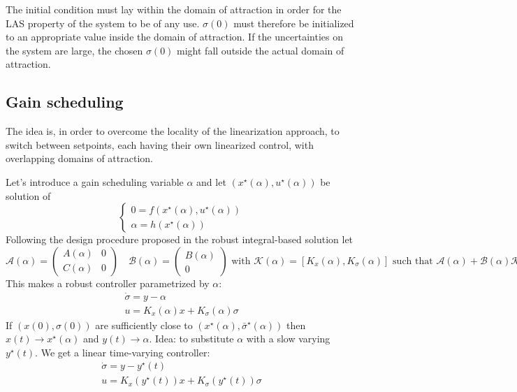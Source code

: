\documentclass{book}
\theoremstyle{definition}
\theoremstyle{remark}
\theoremstyle{remark}
\begin{document}
The initial condition must lay within the domain of attraction in order for the LAS property of the system to be of any use. $\sigma(0)$ must therefore be initialized to an appropriate value inside the domain of attraction. If the uncertainties on the system are large, the chosen $\sigma(0)$ might fall outside the actual domain of attraction.

\subsection{Gain scheduling}
The idea is, in order to overcome the locality of the linearization approach, to switch between setpoints, each having their own linearized control, with overlapping domains of attraction.

Let's introduce a gain scheduling variable $\alpha$ and let $(x^\star(\alpha),u^\star(\alpha))$ be solution of\[
    \left\{ \begin{array}{l}
        0=f(x^\star(\alpha),u^\star(\alpha))\\[1ex]
        {}\alpha=h(x^\star(\alpha))
        \end{array} \right.
    \]
Following the design procedure proposed in the robust integral-based solution let
\[
    \mathcal{A}(\alpha)=\begin{pmatrix}
        A(\alpha) & 0 \\
        C(\alpha) & 0
    \end{pmatrix} \quad \mathcal{B}(\alpha)=\begin{pmatrix}
        B(\alpha) \\ 0
    \end{pmatrix} \text{ with } \mathcal{K}(\alpha)=[K_x(\alpha),K_\sigma(\alpha)] \text{ such that } \mathcal{A}(\alpha)+\mathcal{B}(\alpha)\mathcal{K}(\alpha) \text { is Hurwitz}
\]
This makes a robust controller parametrized by $\alpha$:
\begin{gather*}
    \dot{\sigma}=y-\alpha\\
    u=K_x(\alpha)x+K_\sigma(\alpha)\sigma
\end{gather*}
If $(x(0),\sigma(0))$ are sufficiently close to $(x^\star(\alpha),\bar{\sigma}^\star(\alpha))$ then $x(t)\to x^\star(\alpha)$ and $y(t) \to \alpha$. Idea: to substitute $\alpha$ with a slow varying $y^\star(t)$. We get a linear time-varying controller:
\begin{gather*}
    \dot{\sigma}=y-y^\star(t)\\
    u=K_x(y^\star(t))x+K_\sigma(y^\star(t))\sigma
\end{gather*}
\end{document}
